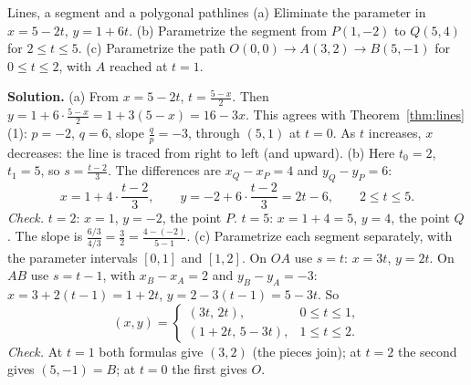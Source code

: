 \documentclass[11pt]{article}
\begin{document}
\begin{exmp}{Lines, a segment and a polygonal path}{lines}
(a) Eliminate the parameter in $x=5-2t$, $y=1+6t$. (b) Parametrize the segment from $P(1,-2)$ to $Q(5,4)$ for $2\le t\le5$. (c) Parametrize the path $O(0,0)\to A(3,2)\to B(5,-1)$ for $0\le t\le2$, with $A$ reached at $t=1$.

\textbf{Solution.} (a) From $x=5-2t$, $t=\frac{5-x}2$. Then $y=1+6\cdot\frac{5-x}2=1+3(5-x)=16-3x$. This agrees with Theorem~\ref{thm:lines}(1): $p=-2$, $q=6$, slope $\frac qp=-3$, through $(5,1)$ at $t=0$. As $t$ increases, $x$ decreases: the line is traced from right to left (and upward).
(b) Here $t_0=2$, $t_1=5$, so $s=\frac{t-2}3$. The differences are $x_Q-x_P=4$ and $y_Q-y_P=6$:
\[
x=1+4\cdot\frac{t-2}3,\qquad y=-2+6\cdot\frac{t-2}3=2t-6,\qquad 2\le t\le5.
\]
\emph{Check.} $t=2$: $x=1$, $y=-2$, the point $P$. $t=5$: $x=1+4=5$, $y=4$, the point $Q$. The slope is $\frac{6/3}{4/3}=\frac32=\frac{4-(-2)}{5-1}$.
(c) Parametrize each segment separately, with the parameter intervals $[0,1]$ and $[1,2]$. On $OA$ use $s=t$: $x=3t$, $y=2t$. On $AB$ use $s=t-1$, with $x_B-x_A=2$ and $y_B-y_A=-3$: $x=3+2(t-1)=1+2t$, $y=2-3(t-1)=5-3t$. So
\[
(x,y)=\begin{cases}(3t,\,2t), & 0\le t\le1,\\ (1+2t,\,5-3t), & 1\le t\le2.\end{cases}
\]
\emph{Check.} At $t=1$ both formulas give $(3,2)$ (the pieces join); at $t=2$ the second gives $(5,-1)=B$; at $t=0$ the first gives $O$.
\end{exmp}

\begin{center}
\end{center}
\end{document}

